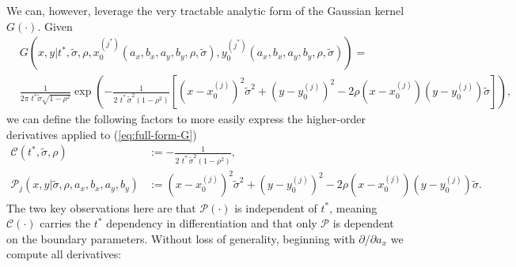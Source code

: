 We can, however, leverage the very tractable analytic form of the
Gaussian kernel $G(\cdot)$. Given
\begin{align}
  & G(x,y | t^{*}, \tilde{\sigma}, \rho, x_0^{(j^*)}(a_x, b_x, a_y, b_y, \rho, \tilde{\sigma}),
    y_0^{(j^*)}(a_x, b_x, a_y, b_y, \rho, \tilde{\sigma})) = &  \nonumber \\
  & \frac{1}{2\pi\,\, t^{*}\tilde{\sigma}\sqrt{1-\rho^2}} \exp\left( -\frac{1}{2\,\,t^*\, \tilde{\sigma}^2 (1-\rho^2)} \left[ \left(x-x_0^{(j)}\right)^2 \tilde{\sigma}^2 + \left(y-y_0^{(j)}\right)^2 - 2\rho(x-x_0^{(j)})(y-y_0^{(j)})\tilde{\sigma} \right]\right), & \label{eq:full-form-G}
\end{align}
we can define the following factors to more easily express the
higher-order derivatives applied to (\ref{eq:full-form-G})
\begin{align}
  \mathcal{C}(t^*, \tilde{\sigma}, \rho) &:= -\frac{1}{2\,\,t^*\, \tilde{\sigma}^2 (1-\rho^2)}, \\
  \mathcal{P}_j(x,y | \tilde{\sigma}, \rho, a_x,b_x,a_y,b_y) &:= \left(x-x_0^{(j)}\right)^2 \tilde{\sigma}^2 + \left(y-y_0^{(j)}\right)^2 - 2\rho(x-x_0^{(j)})(y-y_0^{(j)})\tilde{\sigma}.
\end{align}
The two key observations here are that $\mathcal{P}(\cdot)$ is
independent of $t^{*}$, meaning $\mathcal{C}(\cdot)$ carries the
$t^{*}$ dependency in differentiation and that only $\mathcal{P}$ is
dependent on the boundary parameters. Without loss of generality,
beginning with $\partial/\partial a_x$ we compute all derivatives:
